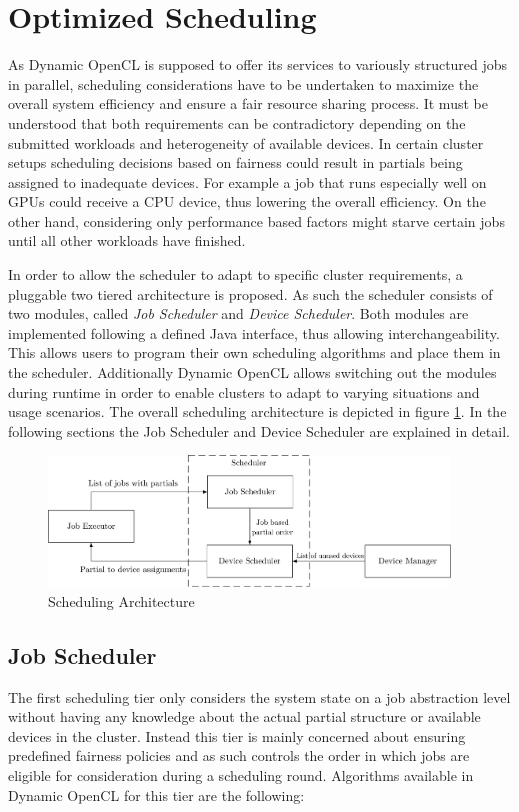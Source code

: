 \section{Optimized Scheduling}

As Dynamic OpenCL is supposed to offer its services to variously structured jobs in parallel, scheduling considerations have to be undertaken to maximize the overall system efficiency and ensure a fair resource sharing process. It must be understood that both requirements can be contradictory depending on the submitted workloads and heterogeneity of available devices. In certain cluster setups scheduling decisions based on fairness could result in partials being assigned to inadequate devices. For example a job that runs especially well on GPUs could receive a CPU device, thus lowering the overall efficiency. On the other hand, considering only performance based factors might starve certain jobs until all other workloads have finished.

In order to allow the scheduler to adapt to specific cluster requirements, a pluggable two tiered architecture is proposed. As such the scheduler consists of two modules, called \textit{Job Scheduler} and \textit{Device Scheduler}. Both modules are implemented following a defined Java interface, thus allowing interchangeability. This allows users to program their own scheduling algorithms and place them in the scheduler. Additionally Dynamic OpenCL allows switching out the modules during runtime in order to enable clusters to adapt to varying situations and usage scenarios. The overall scheduling architecture is depicted in figure \ref{img:scheduling_arch}. In the following sections the Job Scheduler and Device Scheduler are explained in detail.

\begin{figure}[!htb]
	\includegraphics[width=0.95\textwidth]{drawings/scheduling_arch.pdf}
	\centering
	\caption{Scheduling Architecture}
	\label{img:scheduling_arch}
\end{figure}

\subsection{Job Scheduler}
The first scheduling tier only considers the system state on a job abstraction level without having any knowledge about the actual partial structure or available devices in the cluster. Instead this tier is mainly concerned about ensuring predefined fairness policies and as such controls the order in which jobs are eligible for consideration during a scheduling round. Algorithms available in Dynamic OpenCL for this tier are the following:


